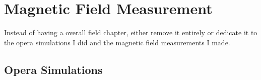 
\thispagestyle{myheadings}

\chapter{Magnetic Field Measurement}
\label{chapter:MagneticFieldMeasurement}




Instead of having a overall field chapter, either remove it entirely or dedicate it to the opera simulations I did and the magnetic field measurements I made.




\section{Opera Simulations}
\label{sec:OperaSimulations}






